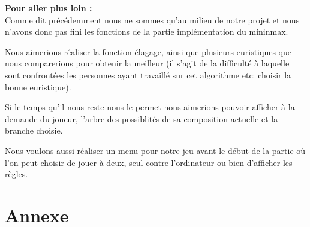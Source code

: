 \documentclass[12,french]{report}
\begin{document}
\textbf{Pour aller plus loin :} \\

Comme dit précédemment nous ne sommes qu'au milieu de notre projet
et nous n'avons donc pas fini les fonctions de la partie implémentation
du mininmax.

Nous aimerions réaliser la fonction élagage, ainsi que plusieurs euristiques
que nous comparerions pour obtenir la meilleur (il s'agit de la difficulté
à laquelle sont confrontées les personnes ayant travaillé sur cet
algorithme etc: choisir la bonne euristique).

Si le temps qu'il nous reste nous le permet nous aimerions pouvoir
afficher à la demande du joueur, l'arbre des possiblités de sa composition
actuelle et la branche choisie. 

Nous voulons aussi réaliser un menu pour notre jeu avant le début
de la partie où l'on peut choisir de jouer à deux, seul contre l'ordinateur
ou bien d'afficher les règles.


\chapter*{Annexe}
\end{document}
